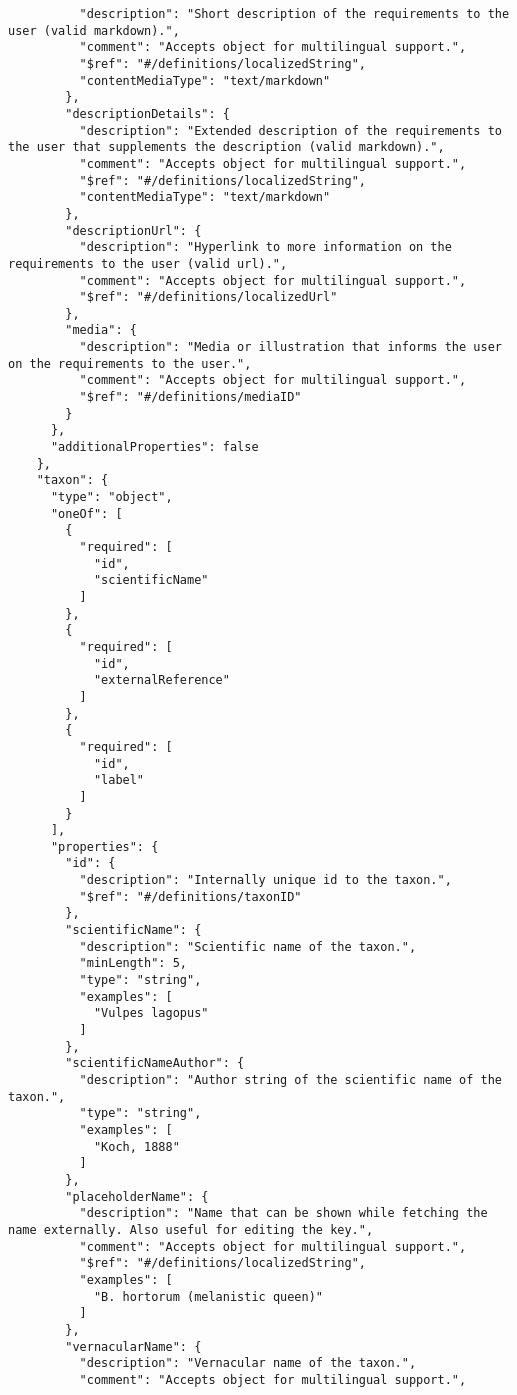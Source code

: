 \documentclass[10pt,letterpaper]{article}
\begin{document}
\begin{verbatim}
          "description": "Short description of the requirements to the
user (valid markdown).",
          "comment": "Accepts object for multilingual support.",
          "$ref": "#/definitions/localizedString",
          "contentMediaType": "text/markdown"
        },
        "descriptionDetails": {
          "description": "Extended description of the requirements to
the user that supplements the description (valid markdown).",
          "comment": "Accepts object for multilingual support.",
          "$ref": "#/definitions/localizedString",
          "contentMediaType": "text/markdown"
        },
        "descriptionUrl": {
          "description": "Hyperlink to more information on the
requirements to the user (valid url).",
          "comment": "Accepts object for multilingual support.",
          "$ref": "#/definitions/localizedUrl"
        },
        "media": {
          "description": "Media or illustration that informs the user
on the requirements to the user.",
          "comment": "Accepts object for multilingual support.",
          "$ref": "#/definitions/mediaID"
        }
      },
      "additionalProperties": false
    },
    "taxon": {
      "type": "object",
      "oneOf": [
        {
          "required": [
            "id",
            "scientificName"
          ]
        },
        {
          "required": [
            "id",
            "externalReference"
          ]
        },
        {
          "required": [
            "id",
            "label"
          ]
        }
      ],
      "properties": {
        "id": {
          "description": "Internally unique id to the taxon.",
          "$ref": "#/definitions/taxonID"
        },
        "scientificName": {
          "description": "Scientific name of the taxon.",
          "minLength": 5,
          "type": "string",
          "examples": [
            "Vulpes lagopus"
          ]
        },
        "scientificNameAuthor": {
          "description": "Author string of the scientific name of the
taxon.",
          "type": "string",
          "examples": [
            "Koch, 1888"
          ]
        },
        "placeholderName": {
          "description": "Name that can be shown while fetching the
name externally. Also useful for editing the key.",
          "comment": "Accepts object for multilingual support.",
          "$ref": "#/definitions/localizedString",
          "examples": [
            "B. hortorum (melanistic queen)"
          ]
        },
        "vernacularName": {
          "description": "Vernacular name of the taxon.",
          "comment": "Accepts object for multilingual support.",

\end{verbatim}
\end{document}
